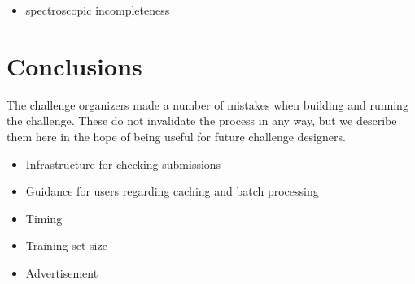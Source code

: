 \documentclass[twocolumn,twocolappendix]{aastex63}
\begin{document}
\begin{itemize}
    \item spectroscopic incompleteness
\end{itemize}

\section{Conclusions}

The challenge organizers made a number of mistakes when building and running the challenge.
These do not invalidate the process in any way, but we describe them here in the hope of
being useful for future challenge designers.

\begin{itemize}
    \item Infrastructure for checking submissions
    \item Guidance for users regarding caching and batch processing
    \item Timing
    \item Training set size
    \item Advertisement
\end{itemize}

\end{document}
